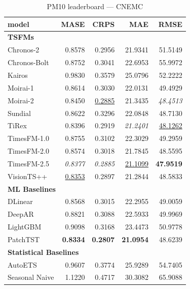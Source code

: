 \begin{table}[H]
\caption{PM10 leaderboard --- CNEMC}
\centering
\begin{small}
\begin{tabular}{lrrrr}
\toprule
model & MASE & CRPS & MAE & RMSE \\
\midrule
\multicolumn{5}{l}{\textbf{TSFMs}} \\
Chronos-2 & 0.8578 & 0.2956 & 21.9341 & 51.5149 \\
Chronos-Bolt & 0.8752 & 0.3041 & 22.6953 & 55.9972 \\
Kairos & 0.9830 & 0.3579 & 25.0796 & 52.2222 \\
Moirai-1 & 0.8614 & 0.3030 & 22.0131 & 49.4929 \\
Moirai-2 & 0.8450 & \underline{0.2885} & 21.3435 & \textit{48.4513} \\
Sundial & 0.8622 & 0.3296 & 22.0848 & 48.7130 \\
TiRex & 0.8396 & 0.2919 & \textit{21.2401} & \underline{48.1262} \\
TimesFM-1.0 & 0.8755 & 0.3102 & 22.3029 & 49.2959 \\
TimesFM-2.0 & 0.8574 & 0.3018 & 21.7845 & 48.5595 \\
TimesFM-2.5 & \textit{0.8377} & \textit{0.2885} & \underline{21.1099} & \textbf{47.9519} \\
VisionTS++ & \underline{0.8353} & 0.2897 & 21.2844 & 48.5833 \\
\midrule
\multicolumn{5}{l}{\textbf{ML Baselines}} \\
DLinear & 0.8568 & 0.3015 & 22.2955 & 49.0059 \\
DeepAR & 0.8821 & 0.3088 & 22.5933 & 49.9969 \\
LightGBM & 0.9098 & 0.3168 & 23.4473 & 50.9778 \\
PatchTST & \textbf{0.8334} & \textbf{0.2807} & \textbf{21.0954} & 48.6239 \\
\midrule
\multicolumn{5}{l}{\textbf{Statistical Baselines}} \\
AutoETS & 0.9607 & 0.3774 & 25.9289 & 54.7405 \\
Seasonal Naive & 1.1220 & 0.4717 & 30.3082 & 65.9088 \\
\bottomrule
\end{tabular}
\end{small}
\end{table}